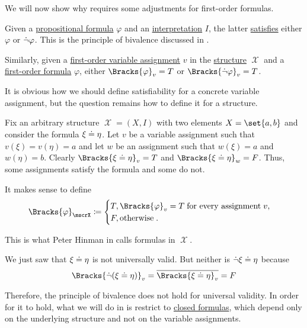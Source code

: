 \begin{remark}\label{rem:first_order_satisfiability_bivalence}
  We will now show why  requires some adjustments for first-order formulas.

  Given a \hyperref[def:propositional_syntax/formula]{propositional formula} \( \varphi \) and an \hyperref[def:propositional_valuation/interpretation]{interpretation} \( I \), the latter \hyperref[def:propositional_model]{satisfies} either \( \varphi \) or \( \dot\neg \varphi \). This is the principle of bivalence discussed in .

  Similarly, given a \hyperref[def:first_order_valuation/variable_assignment]{first-order variable assignment} \( v \) in the \hyperref[def:first_order_structure]{structure} \( \mscrX \) and a \hyperref[def:first_order_syntax/formula]{first-order formula} \( \varphi \), either \( \Bracks{\varphi}_v = T \) or \( \Bracks{\synneg \varphi}_v = T \).

  It is obvious how we should define satisfiability for a concrete variable assignment, but the question remains how to define it for a structure.

  Fix an arbitrary structure \( \mscrX = (X, I) \) with two elements \( X = \set{ a, b } \) and consider the formula \( \xi \doteq \eta \). Let \( v \) be a variable assignment such that \( v(\xi) = v(\eta) = a \) and let \( w \) be an assignment such that \( w(\xi) = a \) and \( w(\eta) = b \). Clearly \( \Bracks{\xi \syneq \eta}_v = T \) and \( \Bracks{\xi \syneq \eta}_w = F \). Thus, some assignments satisfy the formula and some do not.

  It makes sense to define
  \begin{equation*}
    \Bracks{\varphi}_\mscrX
    \coloneqq
    \begin{cases}
      T, \Bracks{\varphi}_v = T \T{for every assignment} v, \\
      F, \T{otherwise}.
    \end{cases}
  \end{equation*}

  This is what Peter Hinman in  calls  formulas in \( \mscrX \).

  We just saw that \( \xi \doteq \eta \) is not universally valid. But neither is \( \dot\neg{\xi \doteq\eta} \) because
  \begin{equation*}
    \Bracks{\synneg (\xi \syneq \eta)}_v = \oline{\Bracks{\xi \syneq \eta}_v} = F
  \end{equation*}

  Therefore, the principle of bivalence does not hold for universal validity. In order for it to hold, what we will do in  is restrict to \hyperref[def:first_order_syntax/closed_formula]{closed formulas}, which depend only on the underlying structure and not on the variable assignments.
\end{remark}

